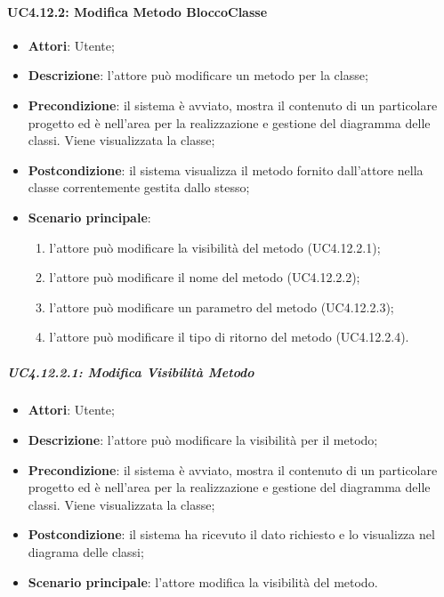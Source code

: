 \paragraph{UC4.12.2: Modifica Metodo BloccoClasse}
\label{UC4.12.2}
\begin{itemize}
	\item \textbf{Attori}: Utente;
	\item \textbf{Descrizione}: l'attore può modificare un metodo per la classe;
	\item \textbf{Precondizione}:  il sistema è avviato, mostra il contenuto di un particolare progetto ed è nell'area per la realizzazione e gestione del diagramma delle classi. Viene visualizzata la classe;
	\item \textbf{Postcondizione}: il sistema visualizza il metodo fornito dall'attore nella classe correntemente gestita dallo stesso;
	\item \textbf{Scenario principale}:
	\begin{enumerate}
		\item l'attore può modificare la visibilità del metodo (UC4.12.2.1);
		\item l'attore può modificare il nome del metodo (UC4.12.2.2);
		\item l'attore può modificare un parametro del metodo (UC4.12.2.3);
		\item l'attore può modificare il tipo di ritorno del metodo (UC4.12.2.4).
	\end{enumerate}
\end{itemize}

\subparagraph{UC4.12.2.1: Modifica Visibilità Metodo}
\label{UC4.12.2.1}
\begin{itemize}
	\item \textbf{Attori}: Utente;
	\item \textbf{Descrizione}: l'attore può modificare la visibilità per il metodo;
	\item \textbf{Precondizione}:  il sistema è avviato, mostra il contenuto di un particolare progetto ed è nell'area per la realizzazione e gestione del diagramma delle classi. Viene visualizzata la classe;
	\item \textbf{Postcondizione}: il sistema ha ricevuto il dato richiesto e lo visualizza nel diagrama delle classi;
	\item \textbf{Scenario principale}: l'attore modifica la visibilità del metodo.
\end{itemize}


